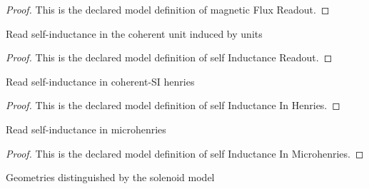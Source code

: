 \begin{proof}
  This is the declared model definition of magnetic Flux Readout.
\end{proof}
\begin{definition}
  \label{def:physics:phyx-mini-0940:phyxminiproblems-problemphyxmini0940-selfinductancereadout}
  Read self-inductance in the coherent unit induced by units
\end{definition}
\begin{proof}
  This is the declared model definition of self Inductance Readout.
\end{proof}
\begin{definition}
  \label{def:physics:phyx-mini-0940:phyxminiproblems-problemphyxmini0940-selfinductanceinhenries}
  Read self-inductance in coherent-SI henries
\end{definition}
\begin{proof}
  This is the declared model definition of self Inductance In Henries.
\end{proof}
\begin{definition}
  \label{def:physics:phyx-mini-0940:phyxminiproblems-problemphyxmini0940-selfinductanceinmicrohenries}
  Read self-inductance in microhenries
\end{definition}
\begin{proof}
  This is the declared model definition of self Inductance In Microhenries.
\end{proof}
\begin{definition}
  \label{def:physics:phyx-mini-0940:phyxminiproblems-problemphyxmini0940-solenoidgeometry}
  Geometries distinguished by the solenoid model
\end{definition}

